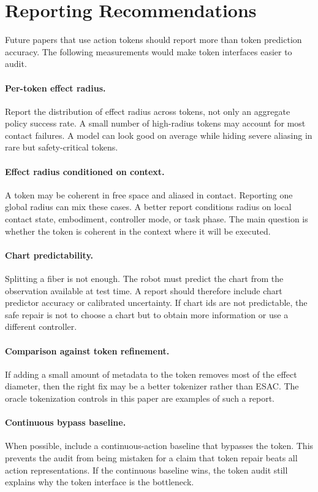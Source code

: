 \documentclass{article}
\begin{document}
\section{Reporting Recommendations}

Future papers that use action tokens should report more than token prediction
accuracy. The following measurements would make token interfaces easier to
audit.

\paragraph{Per-token effect radius.}
Report the distribution of effect radius across tokens, not only an aggregate
policy success rate. A small number of high-radius tokens may account for most
contact failures. A model can look good on average while hiding severe aliasing
in rare but safety-critical tokens.

\paragraph{Effect radius conditioned on context.}
A token may be coherent in free space and aliased in contact. Reporting one
global radius can mix these cases. A better report conditions radius on local
contact state, embodiment, controller mode, or task phase. The main question is
whether the token is coherent in the context where it will be executed.

\paragraph{Chart predictability.}
Splitting a fiber is not enough. The robot must predict the chart from the
observation available at test time. A report should therefore include chart
predictor accuracy or calibrated uncertainty. If chart ids are not predictable,
the safe repair is not to choose a chart but to obtain more information or use a
different controller.

\paragraph{Comparison against token refinement.}
If adding a small amount of metadata to the token removes most of the effect
diameter, then the right fix may be a better tokenizer rather than ESAC. The
oracle tokenization controls in this paper are examples of such a report.

\paragraph{Continuous bypass baseline.}
When possible, include a continuous-action baseline that bypasses the token.
This prevents the audit from being mistaken for a claim that token repair beats
all action representations. If the continuous baseline wins, the token audit
still explains why the token interface is the bottleneck.
\end{document}

